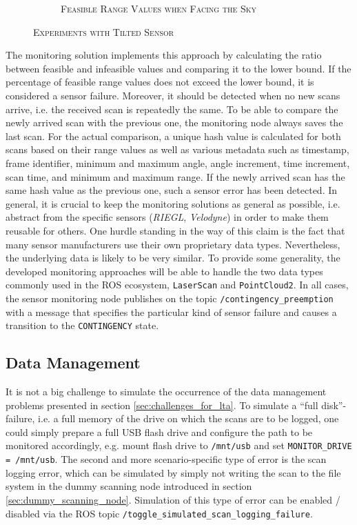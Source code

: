 \documentclass[english, master, utf8]{base/thesis_KBS}
\newcommand{\code}[1]{\colorbox{light-gray}{\texttt{#1}}}
\begin{document}
\begin{figure}[H]
\begin{subfigure}[b]{0.49\textwidth}
        \caption{\textsc{Feasible Range Values when Facing the Sky}}
        \label{fig:straight_line}
    \end{subfigure}
\caption{\textsc{Experiments with Tilted Sensor}}
\label{fig:prototype_sim}
\end{figure}
\noindent
The monitoring solution implements this approach by calculating the ratio between feasible and infeasible values and comparing it to the lower bound.
If the percentage of feasible range values does not exceed the lower bound, it is considered a sensor failure.
Moreover, it should be detected when no new scans arrive, i.e. the received scan is repeatedly the same.
To be able to compare the newly arrived scan with the previous one, the monitoring node always saves the last scan.
For the actual comparison, a unique hash value is calculated for both scans based on their range values as well as various metadata such as timestamp,
frame identifier, minimum and maximum angle, angle increment, time increment, scan time, and minimum and maximum range.
If the newly arrived scan has the same hash value as the previous one, such a sensor error has been detected.
In general, it is crucial to keep the monitoring solutions as general as possible, i.e. abstract from the specific sensors (\textit{RIEGL}, \textit{Velodyne})
in order to make them reusable for others. One hurdle standing in the way of this claim is the fact that many sensor manufacturers use their own proprietary data types.
Nevertheless, the underlying data is likely to be very similar. To provide some generality, the developed monitoring approaches will be able to handle the two data 
types commonly used in the ROS ecosystem, \code{LaserScan} and \code{PointCloud2}. In all cases, the sensor monitoring node publishes on the topic
\code{/contingency\_preemption} with a message that specifies the particular kind of sensor failure and causes a transition to the \code{CONTINGENCY} state.

\subsection{Data Management}
\label{sec:sim_and_mon_data_management}

It is not a big challenge to simulate the occurrence of the data management problems presented in section \ref{sec:challenges_for_lta}. To simulate a ``full disk''-failure,
i.e. a full memory of the drive on which the scans are to be logged, one could simply prepare a full USB flash drive and configure the path to be monitored accordingly,
e.g. mount flash drive to \code{/mnt/usb} and set \code{MONITOR\_DRIVE = /mnt/usb}. The second and more scenario-specific type of error is the scan logging error, which
can be simulated by simply not writing the scan to the file system in the dummy scanning node introduced in section \ref{sec:dummy_scanning_node}. Simulation of this type
of error can be enabled / disabled via the ROS topic \code{/toggle\_simulated\_scan\_logging\_failure}.\newline
\end{document}
